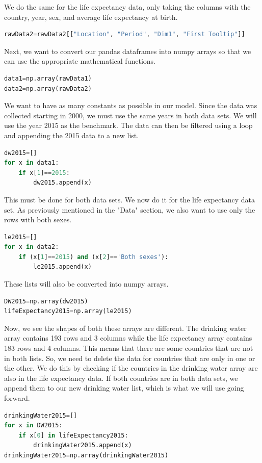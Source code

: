 \documentclass[12pt]{article}
\begin{document}
\noindent
We do the same for the life expectancy data, only taking the columns with the country, year, sex, and average life expectancy at birth.
\begin{lstlisting}[language=Python]
rawData2=rawData2[["Location", "Period", "Dim1", "First Tooltip"]]
\end{lstlisting}

\noindent
Next, we want to convert our pandas dataframes into numpy arrays so that we can use the appropriate mathematical functions.
\begin{lstlisting}[language=Python]
data1=np.array(rawData1)
data2=np.array(rawData2)
\end{lstlisting}

\noindent
We want to have as many constants as possible in our model. Since the data was collected starting in 2000, we must use the same years in both data sets. We will use the year 2015 as the benchmark. The data can then be filtered using a loop and appending the 2015 data to a new list.
\begin{lstlisting}[language=Python]
dw2015=[]
for x in data1:
    if x[1]==2015:
        dw2015.append(x)
\end{lstlisting}

\noindent
This must be done for both data sets. We now do it for the life expectancy data set. As previously mentioned in the "Data" section, we also want to use only the rows with both sexes.
\begin{lstlisting}[language=Python]
le2015=[]
for x in data2:
    if (x[1]==2015) and (x[2]=='Both sexes'):
        le2015.append(x)
\end{lstlisting}

\noindent
These lists will also be converted into numpy arrays.
\begin{lstlisting}[language=Python]
DW2015=np.array(dw2015)
lifeExpectancy2015=np.array(le2015)
\end{lstlisting}

\noindent
Now, we see the shapes of both these arrays are different. The drinking water array contains 193 rows and 3 columns while the life expectancy array contains 183 rows and 4 columns. This means that there are some countries that are not in both lists. So, we need to delete the data for countries that are only in one or the other. We do this by checking if the countries in the drinking water array are also in the life expectancy data. If both countries are in both data sets, we append them to our new drinking water list, which is what we will use going forward.
\begin{lstlisting}[language=Python]
drinkingWater2015=[]
for x in DW2015:
    if x[0] in lifeExpectancy2015:
        drinkingWater2015.append(x)
drinkingWater2015=np.array(drinkingWater2015)
\end{lstlisting}
\end{document}
